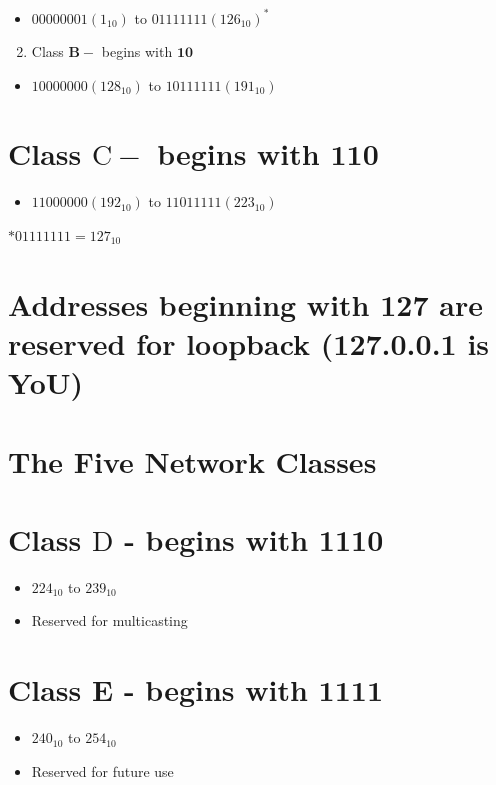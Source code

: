 \documentclass[10pt]{article}
\begin{document}
\begin{itemize}
  \item $00000001\left(1_{10}\right)$ to $01111111\left(126_{10}\right)^{*}$
\end{itemize}

\begin{enumerate}
  \setcounter{enumi}{1}
  \item Class $\mathbf{B}-$ begins with $\mathbf{1 0}$
\end{enumerate}

\begin{itemize}
  \item $10000000\left(128_{10}\right)$ to $10111111\left(191_{10}\right)$
\end{itemize}

\section{Class $\mathrm{C}-$ begins with $\mathbf{1 1 0}$}
\begin{itemize}
  \item $11000000\left(192_{10}\right)$ to $11011111\left(223_{10}\right)$
\end{itemize}

$* 01111111=127_{10}$

\section{Addresses beginning with 127 are reserved for loopback (127.0.0.1 is YoU)}
\section{The Five Network Classes}
\section{Class $\mathrm{D}$ - begins with 1110}
\begin{itemize}
  \item $224_{10}$ to $239_{10}$

  \item Reserved for multicasting

\end{itemize}

\section{Class E - begins with $\mathbf{1 1 1 1}$}
\begin{itemize}
  \item $240_{10}$ to $254_{10}$

  \item Reserved for future use

\end{itemize}
\end{document}
